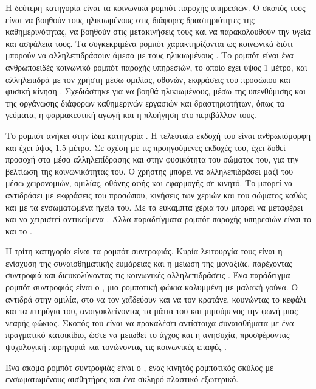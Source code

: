 Η δεύτερη κατηγορία είναι τα κοινωνικά ρομπότ παροχής υπηρεσιών.
Ο σκοπός τους είναι να βοηθούν τους ηλικιωμένους στις διάφορες δραστηριότητες της καθημερινότητας, να βοηθούν στις μετακινήσεις τους και να παρακολουθούν την υγεία και ασφάλεια τους.
Τα συγκεκριμένα ρομπότ χαρακτηρίζονται ως κοινωνικά διότι μπορούν να αλληλεπιδράσουν άμεσα με τους ηλικιωμένους \cite{Robinson2014}.
Το ρομπότ  είναι ένα ανθρωποειδές κοινωνικό ρομπότ παροχής υπηρεσιών, το οποίο έχει ύψος 1 μέτρο, και αλληλεπιδρά με τον χρήστη μέσω ομιλίας, οθονών, εκφράσεις του προσώπου και φυσική κίνηση \cite{Pineau2003}\cite{Pollack2002}.
Σχεδιάστηκε για να βοηθά ηλικιωμένους, μέσω της υπενθύμισης και της οργάνωσης διάφορων καθημερινών εργασιών και δραστηριοτήτων, όπως τα γεύματα, η φαρμακευτική αγωγή και η πλοήγηση στο περιβάλλον τους.
\par
Το ρομπότ  ανήκει στην ίδια κατηγορία \cite{Hans2002}\cite{Kittman2015}\cite{Reiser2013}.
Η τελευταία εκδοχή του είναι ανθρωπόμορφη και έχει ύψος 1.5 μέτρο.
Σε σχέση με τις προηγούμενες εκδοχές του, έχει δοθεί προσοχή στα μέσα αλληλεπίδρασης και στην φυσικότητα του σώματος του, για την βελτίωση της κοινωνικότητας του.
Ο χρήστης μπορεί να αλληλεπιδράσει μαζί του μέσω χειρονομιών, ομιλίας, οθόνης αφής και εφαρμογής σε κινητό.
Το  μπορεί να αντιδράσει με εκφράσεις του προσώπου, κινήσεις των χεριών και του σώματος καθώς και με τα ενσωματωμένα ηχεία του.
Με τα εύκαμπτα χέρια του μπορεί να μεταφέρει και να χειριστεί αντικείμενα \cite{Kittman2015}.
Άλλα παραδείγματα ρομπότ παροχής υπηρεσιών είναι το  \cite{Mukai2010} και το  \cite{Kompai2017}.
\par
Η τρίτη κατηγορία είναι τα ρομπότ συντροφιάς.
Κυρία λειτουργία τους είναι η ενίσχυση της συναισθηματικής ευμάρειας και η μείωση της μοναξιάς, παρέχοντας συντροφιά και διευκολύνοντας τις κοινωνικές αλληλεπιδράσεις \cite{Broekens2009}.
Ένα παράδειγμα ρομπότ συντροφιάς είναι ο , μια ρομποτική φώκια καλυμμένη με μαλακή γούνα.
O  αντιδρά στην ομιλία, στο να τον χαϊδεύουν και να τον κρατάνε, κουνώντας το κεφάλι και τα πτερύγια του, ανοιγοκλείνοντας τα μάτια του και μιμούμενος την φωνή μιας νεαρής φώκιας.
Σκοπός του είναι να προκαλέσει αντίστοιχα συναισθήματα με ένα πραγματικό κατοικίδιο, ώστε να μειωθεί το άγχος και η ανησυχία, προσφέροντας ψυχολογική παρηγοριά και τονώνοντας τις κοινωνικές επαφές \cite{Wada2005}.
\par
Ένα ακόμα ρομπότ συντροφιάς είναι ο , ένας κινητός ρομποτικός σκύλος με ενσωματωμένους αισθητήρες και ένα σκληρό πλαστικό εξωτερικό.
